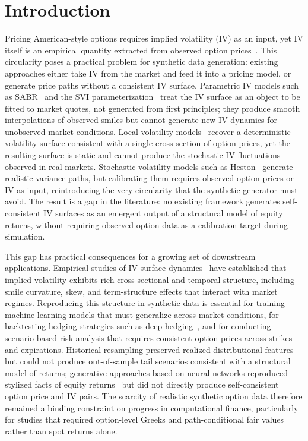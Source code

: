 \section{Introduction}\label{sec:introduction}

Pricing American-style options requires implied volatility (IV) as an input, yet IV itself is an empirical quantity extracted from observed option prices~\cite{black1973}. This circularity poses a practical problem for synthetic data generation: existing approaches either take IV from the market and feed it into a pricing model, or generate price paths without a consistent IV surface. Parametric IV models such as SABR~\cite{hagan2002} and the SVI parameterization~\cite{gatheral2004} treat the IV surface as an object to be fitted to market quotes, not generated from first principles; they produce smooth interpolations of observed smiles but cannot generate new IV dynamics for unobserved market conditions. Local volatility models~\cite{dupire1994,derman1994} recover a deterministic volatility surface consistent with a single cross-section of option prices, yet the resulting surface is static and cannot produce the stochastic IV fluctuations observed in real markets. Stochastic volatility models such as Heston~\cite{heston1993} generate realistic variance paths, but calibrating them requires observed option prices or IV as input, reintroducing the very circularity that the synthetic generator must avoid. The result is a gap in the literature: no existing framework generates self-consistent IV surfaces as an emergent output of a structural model of equity returns, without requiring observed option data as a calibration target during simulation.

This gap has practical consequences for a growing set of downstream applications. Empirical studies of IV surface dynamics~\cite{cont2002} have established that implied volatility exhibits rich cross-sectional and temporal structure, including smile curvature, skew, and term-structure effects that interact with market regimes. Reproducing this structure in synthetic data is essential for training machine-learning models that must generalize across market conditions, for backtesting hedging strategies such as deep hedging~\cite{buehler2019}, and for conducting scenario-based risk analysis that requires consistent option prices across strikes and expirations. Historical resampling preserved realized distributional features~\cite{glasserman2004} but could not produce out-of-sample tail scenarios consistent with a structural model of returns; generative approaches based on neural networks reproduced stylized facts of equity returns~\cite{wiese2020} but did not directly produce self-consistent option price and IV pairs. The scarcity of realistic synthetic option data therefore remained a binding constraint on progress in computational finance, particularly for studies that required option-level Greeks and path-conditional fair values rather than spot returns alone.


